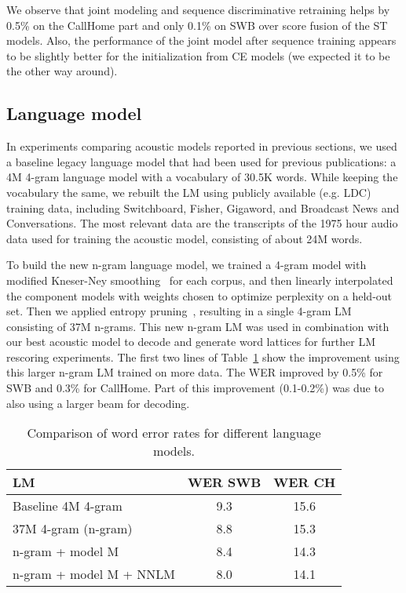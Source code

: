 \documentclass[a4paper]{article}
\begin{document}
We observe that joint modeling and sequence discriminative retraining
helps by 0.5\% on the CallHome part and only 0.1\% on SWB over score
fusion of the ST models. Also, the performance of the joint model
after sequence training appears to be slightly better for the
initialization from CE models (we expected it to be the other way
around).

\subsection{Language model}
\label{LM}

In experiments comparing acoustic models reported in previous
sections, we used a baseline legacy language model that had been used
for previous publications: a 4M 4-gram language model with a
vocabulary of 30.5K words.  While keeping the vocabulary the same, we
rebuilt the LM using publicly available (e.g. LDC) training data,
including Switchboard, Fisher, Gigaword, and Broadcast News and
Conversations.  The most relevant data are the transcripts of the 1975
hour audio data used for training the acoustic model, consisting of
about 24M words.

To build the new n-gram language model, we trained a 4-gram model with
modified Kneser-Ney smoothing~\cite{chen99} for each corpus, and then
linearly interpolated the component models with weights chosen to
optimize perplexity on a held-out set.  Then we applied entropy
pruning~\cite{stolcke98}, resulting in a single 4-gram LM consisting
of 37M n-grams.  This new n-gram LM was used in combination with our
best acoustic model to decode and generate word lattices for further
LM rescoring experiments.  The first two lines of Table~\ref{lm-tab}
show the improvement using this larger n-gram LM trained on more data.
The WER improved by 0.5\% for SWB and 0.3\% for CallHome.  Part of
this improvement (0.1-0.2\%) was due to also using a larger beam for
decoding.

\begin{table}[htpb!]
\begin{center}
\begin{tabular}{|l|c|c|} \hline
LM                        & WER SWB & WER CH \\ \hline 
Baseline 4M 4-gram        & 9.3     & 15.6   \\ \hline
37M 4-gram (n-gram)       & 8.8     & 15.3   \\ \hline
n-gram + model M          & 8.4     & 14.3   \\ \hline
n-gram + model M + NNLM   & 8.0     & 14.1   \\ \hline 
\end{tabular}
\end{center}
\caption{\label{lm-tab}
Comparison of word error rates for different language models.}
\end{table}
\end{document}
